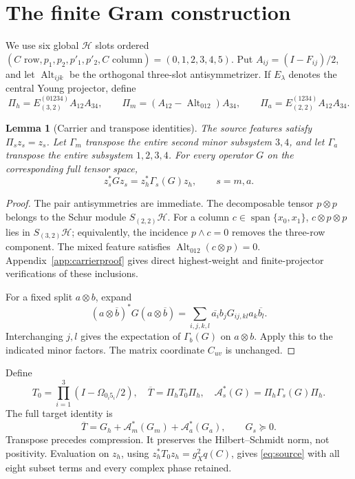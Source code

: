 \documentclass[11pt,a4paper]{article}
\newtheorem{lemma}[theorem]{Lemma}
\theoremstyle{definition}\newtheorem{definition}[theorem]{Definition}
\theoremstyle{remark}\newtheorem{remark}[theorem]{Remark}
\DeclareMathOperator{\Alt}{Alt}\DeclareMathOperator{\diag}{diag}
\newcommand{\HH}{\mathcal H}\newcommand{\LL}{\mathcal L}
\numberwithin{equation}{section}
\begin{document}
\section{The finite Gram construction}\label{sec:gram}
We use six global $\HH$ slots ordered
$(C\text{ row},p_1,p_2,p'_1,p'_2,C\text{ column})=(0,1,2,3,4,5)$.
Put $A_{ij}=(I-F_{ij})/2$, and let $\Alt_{ijk}$ be the orthogonal
three-slot antisymmetrizer. If $E_\lambda$ denotes the central
Young projector, define
\begin{equation}
\Pi_h=E_{(3,2)}^{(01234)}A_{12}A_{34},\qquad
\Pi_m=(A_{12}-\Alt_{012})A_{34},\qquad
\Pi_a=E_{(2,2)}^{(1234)}A_{12}A_{34}.
\label{eq:carriers}
\end{equation}

\begin{lemma}[Carrier and transpose identities]\label{lem:carriers}
The source features satisfy $\Pi_sz_s=z_s$.
Let $\Gamma_m$ transpose the entire second minor subsystem $3,4$,
and let $\Gamma_a$ transpose the entire subsystem $1,2,3,4$.
For every operator $G$ on the corresponding full tensor space,
\begin{equation}
z_s^*Gz_s=z_h^*\Gamma_s(G)z_h,\qquad s=m,a.
\label{eq:transpose}
\end{equation}
\end{lemma}
\begin{proof}
The pair antisymmetries are immediate. The decomposable tensor
$p\otimes p$ belongs to the Schur module $S_{(2,2)}\HH$.
For a column $c\in\operatorname{span}\{x_0,x_1\}$,
$c\otimes p\otimes p$ lies in $S_{(3,2)}\HH$; equivalently, the
incidence $p\wedge c=0$ removes the three-row component.
The mixed feature satisfies $\Alt_{012}(c\otimes p)=0$.
Appendix~\ref{app:carrierproof} gives direct highest-weight and
finite-projector verifications of these inclusions.

For a fixed split $a\otimes b$, expand
\[
(a\otimes\overline b)^*G(a\otimes\overline b)
=\sum_{i,j,k,l}\overline{a_i}b_jG_{ij,kl}a_k\overline{b_l}.
\]
Interchanging $j,l$ gives the expectation of $\Gamma_b(G)$ on
$a\otimes b$. Apply this to the indicated minor factors.
The matrix coordinate $C_{uv}$ is unchanged.
\end{proof}

Define
\begin{equation}
T_0=\prod_{i=1}^3(I-\Omega_{0_i5_i}/2),\quad
\overline T=\Pi_hT_0\Pi_h,\quad
\mathcal A_s^*(G)=\Pi_h\Gamma_s(G)\Pi_h.
\label{eq:maps}
\end{equation}
The full target identity is
\begin{equation}
\overline T=G_h+\mathcal A_m^*(G_m)+\mathcal A_a^*(G_a),
\qquad G_s\succeq0.
\label{eq:target}
\end{equation}
Transpose precedes compression. It preserves the Hilbert--Schmidt
norm, not positivity. Evaluation on $z_h$, using
$z_h^*T_0z_h=g_X^2q(C)$, gives \eqref{eq:source} with all eight
subset terms and every complex phase retained.
\end{document}
